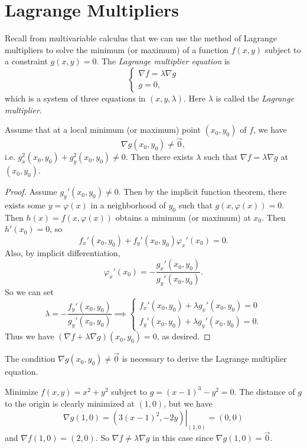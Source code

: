 \section{Lagrange Multipliers}
Recall from multivariable calculus that we can use
the method of Lagrange multipliers to solve
the minimum (or maximum) of a function $f(x, y)$ subject
to a constraint $g(x, y) = 0$. The
\emph{Lagrange multiplier equation} is
\[
  \begin{cases}
    \nabla f = \lambda \nabla g \\
    g = 0,
  \end{cases}
\]
which is a system of three equations in $(x, y, \lambda)$.
Here $\lambda$ is called the \emph{Lagrange multiplier}.

\begin{prop}
Assume that at a local minimum (or maximum) point $(x_0, y_0)$ of $f$, we have
\[
  \nabla g(x_0, y_0) \ne \vec{0},
\]
i.e. $g_x^2(x_0, y_0) + g_y^2(x_0, y_0) \ne 0$. Then there
exists $\lambda$ such that $\nabla f = \lambda \nabla g$
at $(x_0, y_0)$.
\end{prop}

\begin{proof}
  Assume $g_y'(x_0, y_0) \ne 0$. Then by the implicit
  function theorem, there exists some $y = \varphi(x)$
  in a neighborhood of $y_0$ such that
  $g(x, \varphi(x)) = 0$. Then $h(x) = f(x, \varphi(x))$
  obtains a minimum (or maximum) at $x_0$. Then
  $h'(x_0) = 0$, so
  \[
    f_x'(x_0, y_0) + f_y'(x_0, y_0) \varphi_x'(x_0) = 0.
  \]
  Also, by implicit differentiation,
  \[
    \varphi_x'(x_0) = -\frac{g_x'(x_0, y_0)}{g_y'(x_0, y_0)}.
  \]
  So we can set
  \[
    \lambda = -\frac{f_y'(x_0, y_0)}{g_y'(x_0, y_0)}
    \implies
    \begin{cases}
      f_x'(x_0, y_0) + \lambda g_x'(x_0, y_0) = 0 \\
      f_y'(x_0, y_0) + \lambda g_y'(x_0, y_0) = 0.
    \end{cases}
  \]
  Thus we have
  $(\nabla f + \lambda \nabla g)(x_0, y_0) = 0$,
  as desired.
\end{proof}

\begin{remark}
  The condition $\nabla g(x_0, y_0) \ne \vec{0}$ is
  necessary to derive the Lagrange multiplier equation.
\end{remark}

\begin{example}
  Minimize $f(x, y) = x^2 + y^2$ subject to
  $g = (x - 1)^3 - y^2 = 0$. The distance of $g$ to
  the origin is clearly minimized at $(1, 0)$, but we have
  \[
    \nabla g(1, 0)
      = \left.(3(x - 1)^2, -2y)\right|_{(1, 0)}
      = (0, 0)
  \]
  and $\nabla f(1, 0) = (2, 0)$. So
  $\nabla f \ne \lambda \nabla g$ in this case since
  $\nabla g(1, 0) = \vec{0}$.
\end{example}

